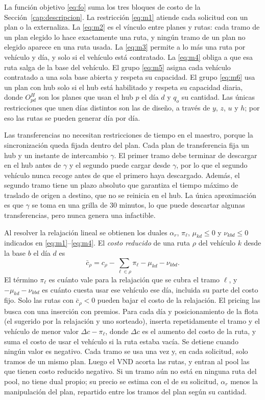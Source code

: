 La función objetivo \eqref{eq:fo} suma los tres bloques de costo de la Sección~\ref{cap:descripcion}. La restricción \eqref{eq:m1} atiende cada solicitud con un plan o la externaliza. La \eqref{eq:m2} es el vínculo entre planes y rutas: cada tramo de un plan elegido lo hace exactamente una ruta, y ningún tramo de un plan no elegido aparece en una ruta usada. La \eqref{eq:m3} permite a lo más una ruta por vehículo y día, y solo si el vehículo está contratado. La \eqref{eq:m4} obliga a que esa ruta salga de la base del vehículo. El grupo \eqref{eq:m5} asigna cada vehículo contratado a una sola base abierta y respeta su capacidad. El grupo \eqref{eq:m6} usa un plan con hub solo si el hub está habilitado y respeta su capacidad diaria, donde $O^H_{pd}$ son los planes que usan el hub $p$ el día $d$ y $q_o$ su cantidad. Las únicas restricciones que unen días distintos son las de diseño, a través de $y$, $z$, $u$ y $h$; por eso las rutas se pueden generar día por día.

 Las transferencias no necesitan restricciones de tiempo en el maestro, porque la sincronización queda fijada dentro del plan. Cada plan de transferencia fija un hub y un instante de intercambio $\gamma$. El primer tramo debe terminar de descargar en el hub antes de $\gamma$ y el segundo puede cargar desde $\gamma$, por lo que el segundo vehículo nunca recoge antes de que el primero haya descargado. Además, el segundo tramo tiene un plazo absoluto que garantiza el tiempo máximo de traslado de origen a destino, que no se reinicia en el hub. La única aproximación es que $\gamma$ se toma en una grilla de 30 minutos, lo que puede descartar algunas transferencias, pero nunca genera una infactible.

 Al resolver la relajación lineal se obtienen los duales $\alpha_r$, $\pi_\ell$, $\mu_{kd}\le0$ y $\nu_{kbd}\le0$ indicados en \eqref{eq:m1}--\eqref{eq:m4}. El \emph{costo reducido} de una ruta $\rho$ del vehículo $k$ desde la base $b$ el día $d$ es
\begin{equation}
\bar c_\rho = c_\rho - \sum_{\ell\in\rho} \pi_\ell - \mu_{kd} - \nu_{kbd}. \label{eq:cr}
\end{equation}
El término $\pi_\ell$ es cuánto vale para la relajación que se cubra el tramo $\ell$, y $-\mu_{kd}-\nu_{kbd}$ es cuánto cuesta usar ese vehículo ese día, incluida su parte del costo fijo. Solo las rutas con $\bar c_\rho<0$ pueden bajar el costo de la relajación. El pricing las busca con una inserción con premios. Para cada día y posicionamiento de la flota (el sugerido por la relajación y uno sorteado), inserta repetidamente el tramo y el vehículo de menor valor $\Delta c - \pi_\ell$, donde $\Delta c$ es el aumento del costo de la ruta, y suma el costo de usar el vehículo si la ruta estaba vacía. Se detiene cuando ningún valor es negativo. Cada tramo se usa una vez y, en cada solicitud, solo tramos de un mismo plan. Luego el VND acorta las rutas, y entran al pool las que tienen costo reducido negativo. Si un tramo aún no está en ninguna ruta del pool, no tiene dual propio; su precio se estima con el de su solicitud, $\alpha_r$ menos la manipulación del plan, repartido entre los tramos del plan según su cantidad.

